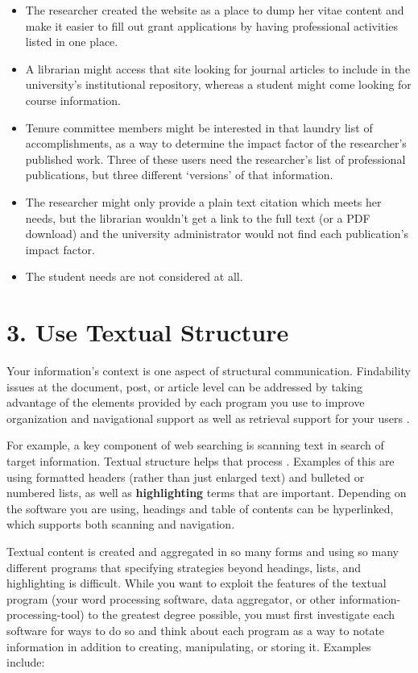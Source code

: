 \documentclass[10pt,letterpaper]{article}
\newcommand{\rulemajor}[1]{\section*{#1}}
\begin{document}
\begin{itemize}
\item
  The researcher created the website as a place to dump her vitae
  content and make it easier to fill out grant applications by having
  professional activities listed in one place.
\item
  A librarian might access that site looking for journal articles to
  include in the university's institutional repository, whereas a student
  might come looking for course information.
\item
  Tenure committee members might be interested in that laundry list of
  accomplishments, as a way to determine the impact factor of the
  researcher's published work. Three of these users need the researcher's
  list of professional publications, but three different `versions' of
  that information.
\item
  The researcher might only provide a plain text citation which meets her
  needs, but the librarian wouldn't get a link to the full text (or a PDF
  download) and the university administrator would not find each
  publication's impact factor.
\item
  The student needs are not considered at all.
\end{itemize}

\rulemajor{3. Use Textual Structure}

Your information's context is one aspect of structural communication.
Findability issues at the document, post, or article level can be
addressed by taking advantage of the elements provided by each program
you use to improve organization and navigational support as well as
retrieval support for your users \cite{Hedden2016}.

For example, a key component of web searching is scanning text in search
of target information. Textual structure helps that process \cite{Krug2014}.
Examples of this are using formatted headers (rather than just enlarged
text) and bulleted or numbered lists, as well as \textbf{highlighting}
terms that are important. Depending on the software you are using,
headings and table of contents can be hyperlinked, which supports both
scanning and navigation.

Textual content is created and aggregated in so many forms and using so
many different programs that specifying strategies beyond headings,
lists, and highlighting is difficult. While you want to exploit the
features of the textual program (your word processing software, data
aggregator, or other information-processing-tool) to the greatest degree
possible, you must first investigate each software for ways to do so and
think about each program as a way to notate information in addition to
creating, manipulating, or storing it. Examples include:
\end{document}
